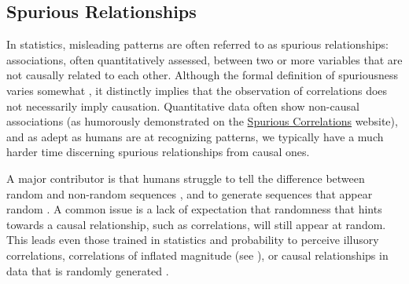 \documentclass{article}
\theoremstyle{plain}
\theoremstyle{definition}
\theoremstyle{remark}
\begin{document}
\subsection{Spurious Relationships}
In statistics, misleading patterns are often referred to as spurious relationships: associations, often quantitatively assessed, between two or more variables that are not causally related to each other. Although the formal definition of spuriousness varies somewhat \cite{haig2003spurious}, it distinctly implies that the observation of correlations does not necessarily imply causation. Quantitative data often show non-causal associations (as humorously demonstrated on the \href{http://www.tylervigen.com/spurious-correlations}{Spurious Correlations} website), and as adept as humans are at recognizing patterns, we typically have a much harder time discerning spurious relationships from causal ones. 

A major contributor is that humans struggle to tell the difference between random and non-random sequences \cite{falk1997making}, and to generate sequences that appear random \cite{ladouceur1996erroneous}. A common issue is a lack of expectation that randomness that hints towards a causal relationship, such as correlations, will still appear at random. This leads even those trained in statistics and probability to perceive illusory correlations, correlations of inflated magnitude (see \citet{nickerson1998confirmation}), or causal relationships in data that is randomly generated \cite{zgraggen2018investigating}.


 



\end{document}
